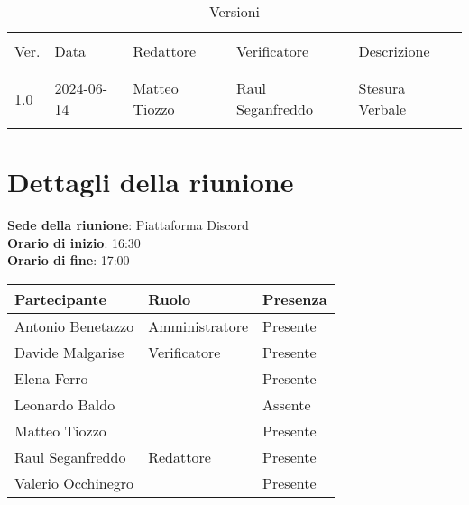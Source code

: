 \documentclass[italian,12pt]{article}
\begin{document}
\newcommand{\mySkip}[1][]{#1}



\newpage



\begin{table}[!h]
	\caption{Versioni}
	\footnotesize
	\begin{center}
		\begin{tabular}{ l l l l p{6cm} }
			\hline                                                                              \\[-2ex]
			Ver. & Data       & Redattore          & Verificatore       & Descrizione           \\
			\\[-2ex] \hline \\[-1.5ex]
			1.0  & 2024-06-14 & Matteo Tiozzo      & Raul Seganfreddo   & Stesura Verbale       \\
			\\[-1.5ex] \hline
		\end{tabular}
	\end{center}
\end{table}

\newpage

\tableofcontents

\newpage

\section{Dettagli della riunione}

\textbf{Sede della riunione}: Piattaforma Discord\\
\textbf{Orario di inizio}: 16:30\\
\textbf{Orario di fine}: 17:00\\

\begin{flushleft}
	\begin{table}[!h]
	\begin{tabular}{ |l|l|l| } 
		\hline
		\textbf{Partecipante} & \textbf{Ruolo}       & \textbf{Presenza} \\
		\hline 
		Antonio Benetazzo     & Amministratore       & Presente          \\
		Davide Malgarise      & Verificatore         & Presente          \\
		Elena Ferro           & 			         & Presente          \\
		Leonardo Baldo        &                      & Assente           \\
		Matteo Tiozzo         & 			         & Presente          \\
		Raul Seganfreddo      & Redattore	         & Presente          \\
		Valerio Occhinegro    &                      & Presente          \\
		\hline
	\end{tabular}
	\end{table}
\end{flushleft}
\end{document}
